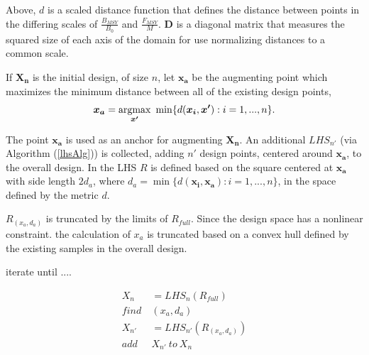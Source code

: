 \documentclass[12pt]{article}
\newcommand{\argmax}{\operatornamewithlimits{argmax}}
\begin{document}
%
Above, $d$ is a scaled distance function that defines the distance between 
points in the differing scales of $\frac{B_{MSY}}{B_0}$ and $\frac{F_{MSY}}{M}$.
$\bm{D}$ is a diagonal matrix that measures the squared size of each axis of 
the domain for use normalizing distances to a common scale.

%
If $\bm{X_n}$ is the initial design, of size $n$, let $\bm{x_a}$ be the 
augmenting point which maximizes the minimum distance between all of the existing 
design points,
%
\begin{align}
	\bm{x_a} = \argmax_{\bm{x'}} ~\min\{ d(\bm{x_i}, \bm{x'}): i=1,...,n \}.
\end{align} 
%

%
The point $\bm{x_a}$ is used as an anchor for augmenting $\bm{X_n}$. %
An additional $LHS_{n'}$ (via Algorithm (\ref{lhsAlg})) is collected, adding 
$n'$ design points, centered around $\bm{x_a}$, to the overall design. %
In the LHS $R$ is defined based on the square centered at $\bm{x_a}$ with side 
length $2d_a$, where \mbox{$d_a = \min\{ d(\bm{x_i}, \bm{x_a}): i=1,...,n \}$},
in the space defined by the metric $d$.
%

%
$R_{(x_a, d_a)}$ is truncated by the limits of $R_{full}$.
Since the design space has a nonlinear constraint. the calculation of $x_a$ is 
truncated based on a convex hull defined by the existing samples in the overall design.

%
{\color{red}iterate until ....}

%
\begin{align}
X_{n} &= LHS_{n}(R_{full})\\
find~&(x_a, d_a)\\
X_{n'} &= LHS_{n'}(R_{(x_a, d_a)})\\
add~&X_{n'}~to~X_{n}
\end{align}
\end{document}

